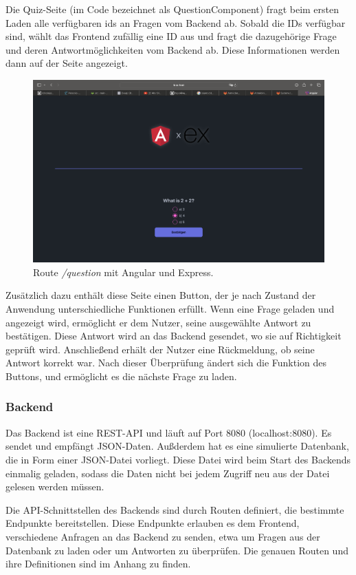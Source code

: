 \documentclass[biblatex]{lni}
\begin{document}
Die Quiz-Seite (im Code bezeichnet als QuestionComponent) fragt beim ersten Laden alle verfügbaren ids an Fragen vom Backend ab.
Sobald die IDs verfügbar sind,
wählt das Frontend zufällig eine ID aus und fragt die dazugehörige Frage und deren Antwortmöglichkeiten vom Backend ab.
Diese Informationen werden dann auf der Seite angezeigt.

\begin{figure}
  \centering
  \includegraphics[width=.8\textwidth]{question-component}
  \caption{Route \textit{/question} mit Angular und Express.}
  \label{fig:question-component}
\end{figure}

Zusätzlich dazu enthält diese Seite einen Button,
der je nach Zustand der Anwendung unterschiedliche Funktionen erfüllt.
Wenn eine Frage geladen und angezeigt wird, ermöglicht er dem Nutzer,
seine ausgewählte Antwort zu bestätigen.
Diese Antwort wird an das Backend gesendet, wo sie auf Richtigkeit geprüft wird.
Anschließend erhält der Nutzer eine Rückmeldung, ob seine Antwort korrekt war.
Nach dieser Überprüfung ändert sich die Funktion des Buttons, und ermöglicht es die nächste Frage zu laden.

\subsubsection{Backend}

Das Backend ist eine REST-API und läuft auf Port 8080 (localhost:8080).
Es sendet und empfängt JSON-Daten.
Außderdem hat es eine simulierte Datenbank, die in Form einer JSON-Datei vorliegt.
Diese Datei wird beim Start des Backends einmalig geladen,
sodass die Daten nicht bei jedem Zugriff neu aus der Datei gelesen werden müssen.

Die API-Schnittstellen des Backends sind durch Routen definiert, die bestimmte Endpunkte bereitstellen.
Diese Endpunkte erlauben es dem Frontend, verschiedene Anfragen an das Backend zu senden, etwa um Fragen aus der Datenbank zu laden oder um Antworten zu überprüfen.
Die genauen Routen und ihre Definitionen sind im Anhang zu finden.
\end{document}
